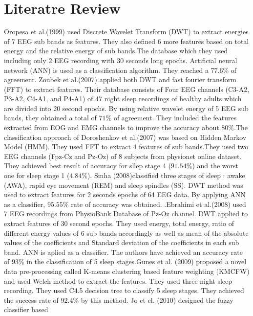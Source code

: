 \documentclass[a4paper, 11pt]{article} %
\begin{document}
\section*{Literatre Review}
Oropesa et al.(1999) used Discrete Wavelet Transform (DWT) to extract energies of 7 EEG sub bands as features. They also defined 6 more features based on total energy and the relative energy of sub bands.The database which they used including only 2 EEG recording with 30 seconds long epochs. Artificial neural network (ANN) is used as a classification algorithm. They reached a $77.6\%$ of agreement. Zoubek et al.(2007) applied both DWT and fast fourier transform (FFT) to extract features. Their database consists of Four EEG
channels (C3-A2, P3-A2, C4-A1, and P4-A1) of 47 night sleep recordings of healthy adults which are divided into 20 second epochs. By using relative wavelet energy of 5 EEG sub bands, they obtained a total of $71\%$ of agreement. They included the features extracted from EOG and EMG channels to improve the accuracy about $80\%$.The classification approach of  Doroshenkov et al.(2007) was based on Hidden Markov Model (HMM). They used FFT to extract 4 features of sub bands.They used two EEG channels (Fpz-Cz and Pz-Oz) of 8 subjects from physionet online dataset. They achieved best result of accuracy for sllep stage 4 ($91.54\%$) and the worst one for sleep stage 1 ($4.84\%$).  Sinha (2008)classified three stages of sleep : awake (AWA), rapid eye movement (REM) and sleep spindles (SS). DWT method was used to extract features for 2 seconds epochs of 64 EEG data.  By applying ANN as a classifier, $95.55\%$ rate of accuracy was obtained. .Ebrahimi et al.(2008) used 7 EEG recordings from PhysioBank Database of Pz-Oz channel. DWT applied to extract features of 30 second epochs. They used energy, total energy, ratio of different energy values of 6 sub bands accordingly as well as mean of the absolute values of the coefficients and Standard deviation of the coefficients in each sub band. ANN is aplied as a classifier. The authors have achieved an accuracy rate of $93\%$ in the classification of 5 sleep stages.Gunes et al. (2009) proposed a novel data pre-processing called K-means clustering based feature weighting (KMCFW) and used Welch method to extract the features. They used three night sleep recording. They used C4.5 decision tree to classify 5 sleep stages. They achieved the success rate of $92.4\%$ by this method. Jo et el. (2010) designed the fuzzy classifier based
\end{document}
